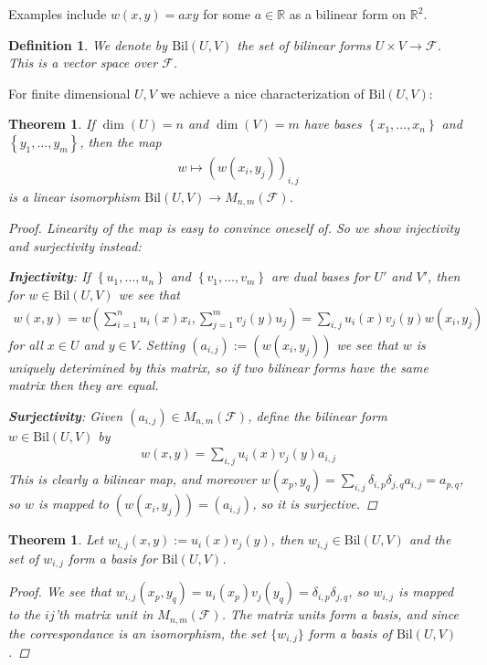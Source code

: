 \documentclass[10pt,twoside,openany,final]{memoir}
\theoremstyle{break}
\newtheorem{theorem}[section]{Theorem}
\newtheorem{definition}[section]{Definition}
\theoremstyle{Break}
\newcommand{\R}{\mathbb{R}}
\newcommand{\F}{\mathcal{F}}
\newcommand{\Bil}{\mathrm{Bil}}
\begin{document}
Examples include $w(x,y)=axy$ for some $a \in \R$ as a bilinear form on $\R^2$. 
\begin{definition}
	We denote by $\Bil(U,V)$ the set of bilinear forms $U \times V \to \F$. This is a vector space over $\F$.
\end{definition}

For finite dimensional $U,V$ we achieve a nice characterization of $\Bil(U,V)$:
\begin{theorem}
	If $\dim(U)=n$ and $\dim(V)=m$ have bases $\left\{ x_1,\dots,x_n \right\}$ and $\left\{ y_1,\dots,y_m \right\}$, then the map
	\begin{align*}
		w \mapsto \left( w(x_i,y_j) \right)_{i,j}
	\end{align*}
	is a linear isomorphism $\Bil(U,V) \to M_{n,m}(\F)$.
	\begin{proof}
		Linearity of the map is easy to convince oneself of. So we show injectivity and surjectivity instead: 
		
		\textbf{Injectivity}: If $\left\{ u_1,\dots,u_n \right\}$ and $\left\{ v_1,\dots,v_m \right\}$ are dual bases for $U'$ and $V'$, then for $w \in \Bil(U,V)$ we see that
		\begin{align*}
			w(x,y)=w\left( \sum_{i=1}^n u_i(x)x_i, \sum_{j=1}^m v_j(y)u_j \right) = \sum_{i,j}u_{i}(x)v_{j}(y) w(x_{i},y_{j})
		\end{align*}
		for all $x \in U$ and $y \in V$. Setting $(a_{i,j}):=(w(x_i,y_j))$ we see that $w$ is uniquely deterimined by this matrix, so if two bilinear forms have the same matrix then they are equal.

		\textbf{Surjectivity}: Given $(a_{i,j}) \in M_{n,m}(\F)$, define the bilinear form $w \in \Bil(U,V)$ by
		\begin{align*}
			w(x,y)=\sum_{i,j}u_i(x) v_j(y) a_{i,j}
		\end{align*}
		This is clearly a bilinear map, and moreover $w(x_p,y_q)=\sum_{i,j}\delta_{i,p}\delta_{j,q}a_{i,j}=a_{p,q}$, so $w$ is mapped to $\left( w(x_i,y_j) \right)=(a_{i,j})$, so it is surjective.
	\end{proof}
\end{theorem}

\begin{theorem}
	Let $w_{i,j}(x,y):=u_i(x)v_j(y)$, then $w_{i,j} \in \Bil(U,V)$ and the set of $w_{i,j}$ form a basis for $\Bil(U,V)$.
	\begin{proof}
		We see that $w_{i,j}(x_p,y_q)=u_i(x_p)v_j(y_q)=\delta_{i,p}\delta_{j,q}$, so $w_{i,j}$ is mapped to the $ij$'th matrix unit in $M_{n,m}(\F)$. The matrix units form a basis, and since the correspondance is an isomorphism, the set $\{w_{i,j}\}$ form a basis of $\Bil(U,V)$.
	\end{proof}
\end{theorem}
\end{document}
